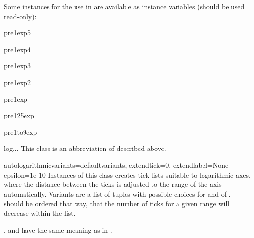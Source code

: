 Some  instances for the use in  are
available as instance variables (should be used read-only):

\begin{memberdesc}{pre1exp5}
\end{memberdesc}

\begin{memberdesc}{pre1exp4}
\end{memberdesc}

\begin{memberdesc}{pre1exp3}
\end{memberdesc}

\begin{memberdesc}{pre1exp2}
\end{memberdesc}

\begin{memberdesc}{pre1exp}
\end{memberdesc}

\begin{memberdesc}{pre125exp}
\end{memberdesc}

\begin{memberdesc}{pre1to9exp}
\end{memberdesc}

\begin{classdesc}{log}{...}
This class is an abbreviation of  described above.
\end{classdesc}

\begin{classdesc}{autologarithmic}{variants=defaultvariants,
                                   extendtick=0, extendlabel=None,
                                   epsilon=1e-10}
  Instances of this class creates tick lists suitable to logarithmic
  axes, where the distance between the ticks is adjusted to the range
  of the axis automatically. Variants are a list of tuples with
  possible choices for  and  of
  .  should be ordered that way, that
  the number of ticks for a given range will decrease within the
   list.

  ,  and  have the same
  meaning as in .
\end{classdesc}

